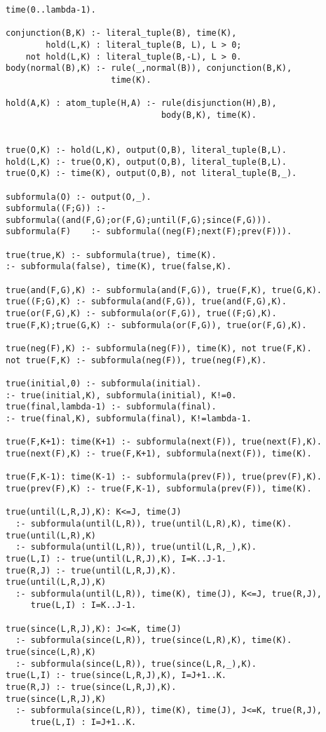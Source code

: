 \begin{center}
\begin{minipage}{\linewidth}
\begin{lstlisting}[language=clingo, label={lst:meta-telingo-one}]
time(0..lambda-1).

conjunction(B,K) :- literal_tuple(B), time(K),
        hold(L,K) : literal_tuple(B, L), L > 0;
    not hold(L,K) : literal_tuple(B,-L), L > 0.
body(normal(B),K) :- rule(_,normal(B)), conjunction(B,K), 
                     time(K).

hold(A,K) : atom_tuple(H,A) :- rule(disjunction(H),B), 
                               body(B,K), time(K).


true(O,K) :- hold(L,K), output(O,B), literal_tuple(B,L).
hold(L,K) :- true(O,K), output(O,B), literal_tuple(B,L).
true(O,K) :- time(K), output(O,B), not literal_tuple(B,_).

subformula(O) :- output(O,_).
subformula((F;G)) :- subformula((and(F,G);or(F,G);until(F,G);since(F,G))).
subformula(F)	 :- subformula((neg(F);next(F);prev(F))).

true(true,K) :- subformula(true), time(K).
:- subformula(false), time(K), true(false,K).

true(and(F,G),K) :- subformula(and(F,G)), true(F,K), true(G,K).
true((F;G),K) :- subformula(and(F,G)), true(and(F,G),K).
true(or(F,G),K) :- subformula(or(F,G)), true((F;G),K).
true(F,K);true(G,K) :- subformula(or(F,G)), true(or(F,G),K).

true(neg(F),K) :- subformula(neg(F)), time(K), not true(F,K).
not true(F,K) :- subformula(neg(F)), true(neg(F),K).

true(initial,0) :- subformula(initial).
:- true(initial,K), subformula(initial), K!=0.
true(final,lambda-1) :- subformula(final).
:- true(final,K), subformula(final), K!=lambda-1.

true(F,K+1): time(K+1) :- subformula(next(F)), true(next(F),K).
true(next(F),K) :- true(F,K+1), subformula(next(F)), time(K).

true(F,K-1): time(K-1) :- subformula(prev(F)), true(prev(F),K).
true(prev(F),K) :- true(F,K-1), subformula(prev(F)), time(K).

true(until(L,R,J),K): K<=J, time(J)
  :- subformula(until(L,R)), true(until(L,R),K), time(K).
true(until(L,R),K)
  :- subformula(until(L,R)), true(until(L,R,_),K).
true(L,I) :- true(until(L,R,J),K), I=K..J-1.
true(R,J) :- true(until(L,R,J),K).
true(until(L,R,J),K)
  :- subformula(until(L,R)), time(K), time(J), K<=J, true(R,J), 
     true(L,I) : I=K..J-1.

true(since(L,R,J),K): J<=K, time(J)
  :- subformula(since(L,R)), true(since(L,R),K), time(K).
true(since(L,R),K)
  :- subformula(since(L,R)), true(since(L,R,_),K).
true(L,I) :- true(since(L,R,J),K), I=J+1..K.
true(R,J) :- true(since(L,R,J),K).
true(since(L,R,J),K)
  :- subformula(since(L,R)), time(K), time(J), J<=K, true(R,J), 
     true(L,I) : I=J+1..K.
\end{lstlisting}
\end{minipage}
\end{center}

